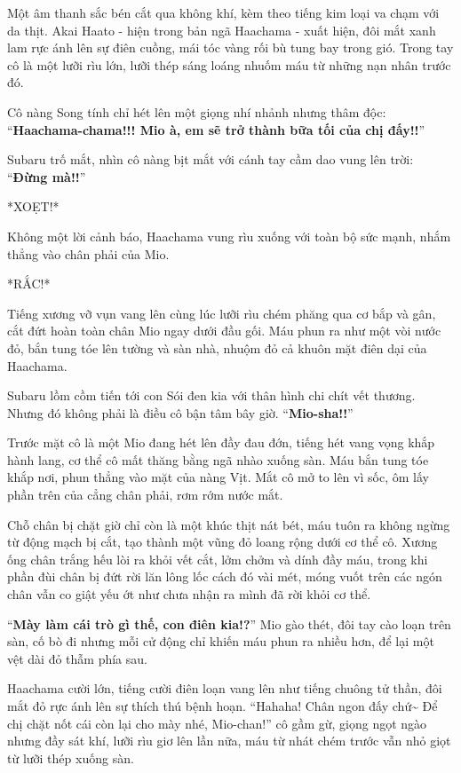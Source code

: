 \documentclass[../main.tex]{subfiles}
\begin{document}
Một âm thanh sắc bén cắt qua không khí, kèm theo tiếng kim loại va chạm với da thịt. Akai Haato - hiện trong bản ngã Haachama - xuất hiện, đôi mắt xanh lam rực ánh lên sự điên cuồng, mái tóc vàng rối bù tung bay trong gió. Trong tay cô là một lưỡi rìu lớn, lưỡi thép sáng loáng nhuốm máu từ những nạn nhân trước đó.

Cô nàng Song tính chỉ hét lên một giọng nhí nhảnh nhưng thâm độc: ``\textbf{Haachama-chama!!! Mio à, em sẽ trở thành bữa tối của chị đấy!!}''

Subaru trố mắt, nhìn cô nàng bịt mắt với cánh tay cầm dao vung lên trời: ``\textbf{Đừng mà!!}''

*XOẸT!*

Không một lời cảnh báo, Haachama vung rìu xuống với toàn bộ sức mạnh, nhắm thẳng vào chân phải của Mio.

*RẮC!*

Tiếng xương vỡ vụn vang lên cùng lúc lưỡi rìu chém phăng qua cơ bắp và gân, cắt đứt hoàn toàn chân Mio ngay dưới đầu gối. Máu phun ra như một vòi nước đỏ, bắn tung tóe lên tường và sàn nhà, nhuộm đỏ cả khuôn mặt điên dại của Haachama.

Subaru lồm cồm tiến tới con Sói đen kia với thân hình chi chít vết thương. Nhưng đó không phải là điều cô bận tâm bây giờ. ``\textbf{Mio-sha!!}''

Trước mặt cô là một Mio đang hét lên đầy đau đớn, tiếng hét vang vọng khắp hành lang, cơ thể cô mất thăng bằng ngã nhào xuống sàn. Máu bắn tung tóe khắp nơi, phun thẳng vào mặt của nàng Vịt. Mắt cô mở to lên vì sốc, ôm lấy phần trên của cẳng chân phải, rơm rớm nước mắt.

Chỗ chân bị chặt giờ chỉ còn là một khúc thịt nát bét, máu tuôn ra không ngừng từ động mạch bị cắt, tạo thành một vũng đỏ loang rộng dưới cơ thể cô. Xương ống chân trắng hếu lòi ra khỏi vết cắt, lởm chởm và dính đầy máu, trong khi phần đùi chân bị đứt rời lăn lông lốc cách đó vài mét, móng vuốt trên các ngón chân vẫn co giật yếu ớt như chưa nhận ra mình đã rời khỏi cơ thể.

``\textbf{Mày làm cái trò gì thế, con điên kia!?}'' Mio gào thét, đôi tay cào loạn trên sàn, cố bò đi nhưng mỗi cử động chỉ khiến máu phun ra nhiều hơn, để lại một vệt dài đỏ thẫm phía sau.

Haachama cười lớn, tiếng cười điên loạn vang lên như tiếng chuông tử thần, đôi mắt đỏ rực ánh lên sự thích thú bệnh hoạn. ``Hahaha! Chân ngon đấy chứ\~{} Để chị chặt nốt cái còn lại cho mày nhé, Mio-chan!'' cô gầm gừ, giọng ngọt ngào nhưng đầy sát khí, lưỡi rìu giơ lên lần nữa, máu từ nhát chém trước vẫn nhỏ giọt từ lưỡi thép xuống sàn.
\end{document}
